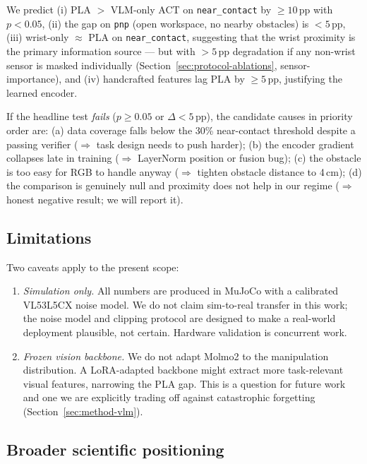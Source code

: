 \documentclass[11pt]{article}
\begin{document}
We predict (i) PLA $>$ VLM-only ACT on \texttt{near\_contact} by
$\geq 10$\,pp with $p < 0.05$, (ii) the gap on \texttt{pnp} (open
workspace, no nearby obstacles) is $< 5$\,pp, (iii) wrist-only $\approx$
PLA on \texttt{near\_contact}, suggesting that the wrist proximity is
the primary information source --- but with $> 5$\,pp degradation if any
non-wrist sensor is masked individually
(Section~\ref{sec:protocol-ablations}, sensor-importance), and (iv)
handcrafted features lag PLA by $\geq 5$\,pp, justifying the learned
encoder.

If the headline test \emph{fails} ($p \geq 0.05$ or $\Delta < 5$\,pp),
the candidate causes in priority order are: (a) data coverage falls
below the 30\% near-contact threshold despite a passing verifier
($\Rightarrow$ task design needs to push harder); (b) the encoder
gradient collapses late in training ($\Rightarrow$ LayerNorm position or
fusion bug); (c) the obstacle is too easy for RGB to handle anyway
($\Rightarrow$ tighten obstacle distance to 4\,cm); (d) the comparison
is genuinely null and proximity does not help in our regime
($\Rightarrow$ honest negative result; we will report it).

\subsection{Limitations}

Two caveats apply to the present scope:

\begin{enumerate}[leftmargin=1.5em,topsep=0.2em,itemsep=0.2em]
\item \emph{Simulation only.} All numbers are produced in MuJoCo with a
  calibrated VL53L5CX noise model. We do not claim sim-to-real transfer
  in this work; the noise model and clipping protocol are designed to
  make a real-world deployment plausible, not certain. Hardware
  validation is concurrent work.
\item \emph{Frozen vision backbone.} We do not adapt Molmo2 to the
  manipulation distribution. A LoRA-adapted backbone might extract more
  task-relevant visual features, narrowing the PLA gap. This is a
  question for future work and one we are explicitly trading off
  against catastrophic forgetting (Section~\ref{sec:method-vlm}).
\end{enumerate}

\subsection{Broader scientific positioning}
\end{document}
